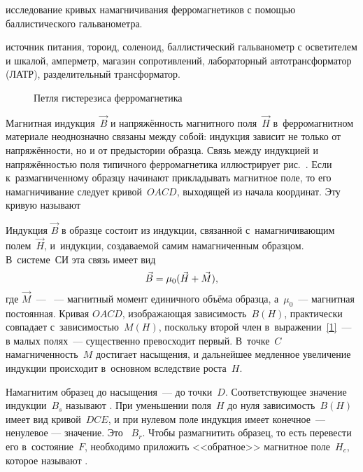 
\begin{lab:aim}
	исследование кривых намагничивания ферромагнетиков с помощью баллистического гальванометра.
\end{lab:aim}

\begin{lab:equipment}
	источник питания, тороид, соленоид, баллистический гальванометр с осветителем и шкалой,
	амперметр, магазин сопротивлений, лабораторный автотрансформатор (ЛАТР), разделительный трансформатор.
\end{lab:equipment}


\begin{wrapfigure}[15]{r}{0.4\textwidth}
	\caption{Петля гистерезиса ферромагнетика}
\end{wrapfigure}


Магнитная индукция~$\vec{B}$ и напряжённость магнитного поля~$\vec{H}$ в~ферромагнитном материале неоднозначно связаны между
собой: индукция зависит не только от напряжённости, но и от предыстории образца. Связь между индукцией и напряжённостью
поля типичного ферромагнетика иллюстрирует рис.~. Если к~размагниченному образцу начинают прикладывать магнитное поле,
то его намагничивание следует кривой~$OACD$, выходящей из начала координат. Эту кривую называют 

Индукция $\vec{B}$ в образце состоит из индукции, связанной с~намагничивающим полем~$\vec{H}$, и~индукции, создаваемой самим
намагниченным образцом. В~системе~СИ эта связь имеет вид
\begin{equation}
	\eqmark{1}
	\vec{B}=\mu_0(\vec{H}+\vec{M}),
\end{equation}
где $\vec{M}$~--- ~--- магнитный момент единичного объёма образца, а~$\mu_0$~--- магнитная
постоянная. Кривая $OACD$, изображающая зависимость~$B(H)$, практически совпадает с~зависимостью~$M(H)$, поскольку
второй член в~выражении~\eqref{1}~--- в малых полях~--- существенно превосходит первый. В~точке~$C$ намагниченность~$M$
достигает насыщения, и дальнейшее медленное увеличение индукции происходит в~основном вследствие роста~$H$.

Намагнитим образец до насыщения~--- до точки~$D$. Соответствующее значение индукции~$B_s$ называют . При уменьшении поля~$H$ до нуля зависимость~$B(H)$ имеет вид кривой~$DCE$, и при нулевом поле индукция имеет
конечное~--- ненулевое --- значение. Это ~$B_r$. Чтобы размагнитить образец, то есть перевести
его в~состояние~$F$, необходимо приложить <<обратное>> магнитное поле~$H_c$, которое называют .

